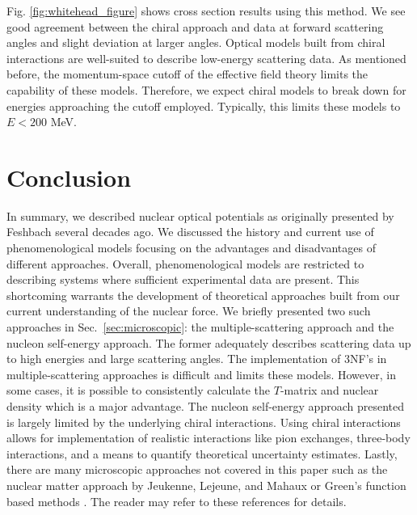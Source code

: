 \documentclass[preprintnumbers,floatfix,aps,prc,preprint,nofootinbib]{revtex4-1}
\begin{document}
Fig. \ref{fig:whitehead_figure} shows cross section results using this method. We see good agreement between the chiral approach and data at forward scattering angles and slight deviation at larger angles. Optical models built from chiral interactions are well-suited to describe low-energy scattering data. As mentioned before, the momentum-space cutoff of the effective field theory limits the capability of these models. Therefore, we expect chiral models to break down for energies approaching the cutoff employed. Typically, this limits these models to $E < 200$ MeV.


\section{Conclusion}
\label{sec:conclusion}


In summary, we described nuclear optical potentials as originally presented by Feshbach several decades ago. We discussed the history and current use of phenomenological models focusing on the advantages and disadvantages of different approaches. Overall, phenomenological models are restricted to describing systems where sufficient experimental data are present. This shortcoming warrants the development of theoretical approaches built from our current understanding of the nuclear force. We briefly presented two such approaches in Sec.~\ref{sec:microscopic}: the multiple-scattering approach and the nucleon self-energy approach. The former adequately describes scattering data up to high energies and large scattering angles. The implementation of 3NF's in multiple-scattering approaches is difficult and limits these models. However, in some cases, it is possible to consistently calculate the $T$-matrix and nuclear density which is a major advantage. The nucleon self-energy approach presented is largely limited by the underlying chiral interactions. Using chiral interactions allows for implementation of realistic interactions like pion exchanges, three-body interactions, and a means to quantify theoretical uncertainty estimates. Lastly, there are many microscopic approaches not covered in this paper such as the nuclear matter approach by Jeukenne, Lejeune, and Mahaux \cite{Jeukenne:1977zz} or Green's function based methods \cite{Dickhoff:2018wdd}. The reader may refer to these references for details.
\\
\end{document}
